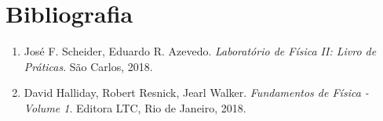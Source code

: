 \newpage
\section{Bibliografia}

\begin{enumerate}
  \item José F. Scheider, Eduardo R. Azevedo. \textit{Laboratório de Física II: Livro de Práticas}. São Carlos, 2018.
  \item David Halliday, Robert Resnick, Jearl Walker. \textit{Fundamentos de Física - Volume 1}. Editora LTC, Rio de Janeiro, 2018.
\end{enumerate}
